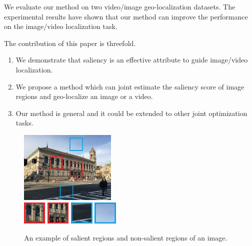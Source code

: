 \par
We evaluate our method on two video/image geo-localization datasets. The experimental results have shown that our method can improve the performance on the image/video localization task.
\par
The contribution of this paper is threefold. 
\begin{enumerate}
\item We demonstrate that saliency is an effective attribute to guide image/video localization. 
\item We propose a method which can joint estimate the saliency score of image regions and geo-localize an image or a video.
\item Our method is general and it could be extended to other joint optimization tasks. 
\end{enumerate}
\begin{figure}
\includegraphics[width=0.41\textwidth]{img/library}
\\[0.1cm]
\includegraphics[width=0.1\textwidth]{img/library_1}
\includegraphics[width=0.1\textwidth]{img/library_2}
\includegraphics[width=0.1\textwidth]{img/library_3}
\includegraphics[width=0.1\textwidth]{img/library_4}
\caption{An example of salient regions and non-salient regions of an image.}
\label{fig:library}
\end{figure}



